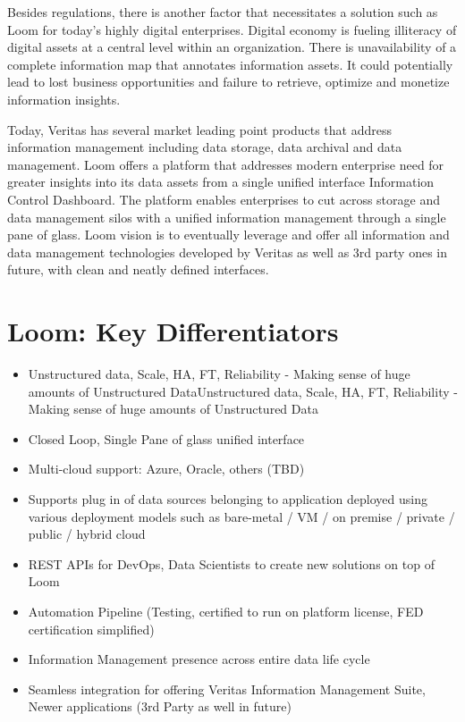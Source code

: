 \documentclass[letterpaper,10pt,english]{sphinxmanual}
\begin{document}
Besides regulations, there is another factor that necessitates a solution such as Loom for today’s highly digital enterprises. Digital economy is fueling illiteracy of digital assets at a central level within an organization. There is unavailability of a complete information map that annotates information assets. It could potentially lead to lost business opportunities and failure to retrieve, optimize and monetize information insights.

Today, Veritas has several market leading point products that address information management including data storage, data archival and data management. Loom offers a platform that addresses modern enterprise need for greater insights into its data assets from a single unified interface \textendash{} Information Control Dashboard.  The platform enables enterprises to cut across storage and data management silos with a unified information management through a single pane of glass. Loom vision is to eventually leverage and offer all information and data management technologies developed by Veritas as well as 3rd party ones in future, with clean and neatly defined interfaces.


\chapter{Loom: Key Differentiators}
\label{\detokenize{mcdmp_concepts:loom-key-differentiators}}\begin{itemize}
\item {} 
Unstructured data, Scale, HA, FT, Reliability - Making sense of huge amounts of Unstructured DataUnstructured data, Scale, HA, FT, Reliability - Making sense of huge amounts of Unstructured Data

\item {} 
Closed Loop, Single Pane of glass unified interface

\item {} 
Multi-cloud support: Azure, Oracle, others (TBD)

\item {} 
Supports plug in of data sources belonging to application deployed using various deployment models such as bare-metal / VM / on premise / private / public / hybrid cloud

\item {} 
REST APIs for DevOps, Data Scientists to create new solutions on top of Loom

\item {} 
Automation Pipeline (Testing, certified to run on platform \textendash{} license, FED certification simplified)

\item {} 
Information Management presence across entire data life cycle

\item {} 
Seamless integration for offering Veritas Information Management Suite, Newer applications (3rd Party as well in future)

\end{itemize}
\end{document}

